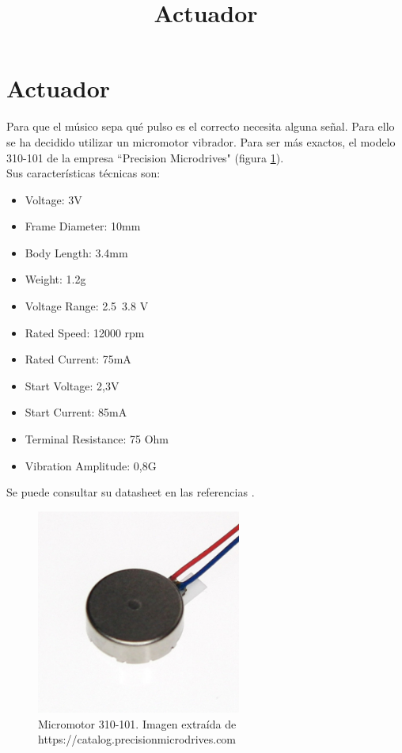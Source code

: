 \section{Actuador}
\title{Actuador}
Para que el músico sepa qué pulso es el correcto necesita alguna señal. Para ello
se ha decidido utilizar un micromotor vibrador. Para ser más exactos, el modelo 310-101 de la empresa
``Precision Microdrives" (figura \ref{fig:micromotor}).\\

Sus características técnicas son:

\begin{itemize}
  \item Voltage: 3V
  \item Frame Diameter: 10mm
  \item Body Length: 3.4mm
  \item Weight: 1.2g
  \item Voltage Range: 2.5~3.8 V
  \item Rated Speed: 12000 rpm
  \item Rated Current: 75mA
  \item Start Voltage: 2,3V
  \item Start Current: 85mA
  \item Terminal Resistance: 75 Ohm
  \item Vibration Amplitude: 0,8G
\end{itemize}

Se puede consultar su datasheet en las referencias \cite{micromotorData}.

\begin{figure}[!htb]
\centering
\includegraphics[width=0.6\textwidth]{./imagenes/micromotor}
\caption{Micromotor 310-101. Imagen extraída de \scriptsize{https://catalog.precisionmicrodrives.com}} \label{fig:micromotor}
\end{figure}


